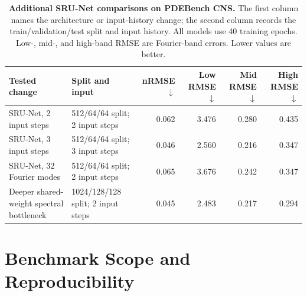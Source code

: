 \documentclass[11pt]{article}
\begin{document}
\begin{table}[t]
\centering
\scriptsize
\setlength{\tabcolsep}{3pt}
\caption{\textbf{Additional SRU-Net comparisons on PDEBench CNS.}
The first column names the architecture or input-history change; the second column records the
train/validation/test split and input history. All models use 40
training epochs. Low-,
mid-, and high-band RMSE are Fourier-band errors. Lower values are better.}
\label{tab:cns_ablation}
\begin{tabular}{p{1.18in}p{1.45in}rrrr}
\toprule
Tested change & Split and input & nRMSE $\downarrow$ &
Low RMSE $\downarrow$ & Mid RMSE $\downarrow$ & High RMSE $\downarrow$ \\
\midrule
SRU-Net, 2 input steps & 512/64/64 split; 2 input steps & 0.062 & 3.476 & 0.280 & 0.435 \\
SRU-Net, 3 input steps & 512/64/64 split; 3 input steps & 0.046 & 2.560 & 0.216 & 0.347 \\
SRU-Net, 32 Fourier modes & 512/64/64 split; 2 input steps & 0.065 & 3.676 & 0.242 & 0.347 \\
Deeper shared-weight spectral bottleneck & 1024/128/128 split; 2 input steps & 0.045 & 2.483 & 0.217 & 0.294 \\
\bottomrule
\end{tabular}
\end{table}

\section{Benchmark Scope and Reproducibility}
\end{document}
